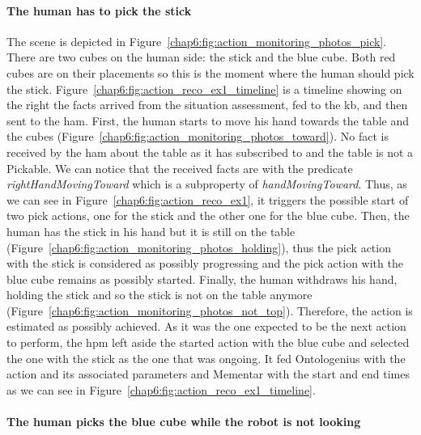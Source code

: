 \documentclass[a4paper,11pt,twoside]{StyleThese}
\begin{document}
\paragraph{The human has to pick the stick}

The scene is depicted in Figure~\ref{chap6:fig:action_monitoring_photos_pick}. There are two cubes on the human side: the stick and the blue cube. Both red cubes are on their placements so this is the moment where the human should pick the stick. Figure~\ref{chap6:fig:action_reco_ex1_timeline} is a timeline showing on the right the facts arrived from the situation assessment, fed to the \acrshort{kb}, and then sent to the \acrshort{ham}. First, the human starts to move his hand towards the table and the cubes (Figure~\ref{chap6:fig:action_monitoring_photos_toward}). No fact is received by the \acrshort{ham} about the table as it has subscribed to  and the table is not a Pickable. We can notice that the received facts are with the predicate \textit{rightHandMovingToward} which is a subproperty of \textit{handMovingToward}. Thus, as we can see in Figure~\ref{chap6:fig:action_reco_ex1}, it triggers the possible start of two pick actions, one for the stick and the other one for the blue cube. Then, the human has the stick in his hand but it is still on the table (Figure~\ref{chap6:fig:action_monitoring_photos_holding}), thus the pick action with the stick is considered as possibly progressing and the pick action with the blue cube remains as possibly started. Finally, the human withdraws his hand, holding the stick and so the stick is not on the table anymore (Figure~\ref{chap6:fig:action_monitoring_photos_not_top}). Therefore, the action is estimated as possibly achieved. As it was the one expected to be the next action to perform, the \acrlong{hpm} left aside the started action with the blue cube and selected the one with the stick as the one that was ongoing. It fed Ontologenius with the action and its associated parameters and Mementar with the start and end times as we can see in Figure~\ref{chap6:fig:action_reco_ex1_timeline}.

\paragraph{The human picks the blue cube while the robot is not looking} 
\end{document}
